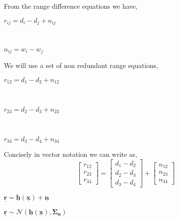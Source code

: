 \documentclass[a4 paper]{article}
\begin{document}
\setlength{\abovedisplayskip}{3pt}
\setlength{\belowdisplayskip}{3pt}


\solution From the range difference equations we have,
\\ \centerline{$ r_{ij} = d_{i} - d_{j} + n_{ij} $}
\\ \centerline{$ n_{ij} = w_{i} - w_{j} $}

We will use a set of non redundant range equations,
\\ \centerline{$ r_{12} = d_{1} - d_{2} + n_{12} $}
\\ \centerline{$ r_{23} = d_{2} - d_{3} + n_{23} $}
\\ \centerline{$ r_{34} = d_{3} - d_{4} + n_{34} $}

Concisely in vector notation we can write as,
\[
\begin{bmatrix}
r_{12} \\ r_{23} \\ r_{34}
\end{bmatrix}
=
\begin{bmatrix}
d_{1} - d_{2} \\ d_{2}-d_{3} \\ d_{3}-d_{4}
\end{bmatrix}
+
\begin{bmatrix}
n_{12} \\ n_{23} \\ n_{34}
\end{bmatrix}
\]

\centerline{$ \mathbf{\underline{r}} = \mathbf{\underline{h}(\mathbf{\underline{x}})} + \mathbf{\underline{n}} $}
\centerline{$ \mathbf{\underline{r}} \sim \mathcal{N}(\mathbf{\underline{h}(\mathbf{\underline{x}})}, \mathbf{\Sigma_{n}})$}
\end{document}
